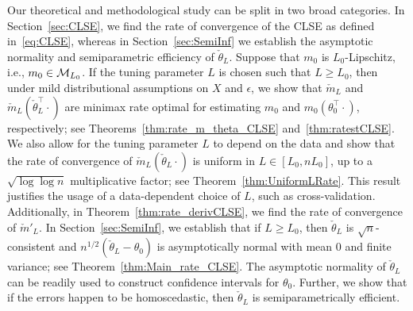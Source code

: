 
Our theoretical and methodological study can be split in two broad categories. In Section~\ref{sec:CLSE}, we find the rate of convergence of the CLSE as defined in~\eqref{eq:CLSE}, whereas in Section~\ref{sec:SemiInf} we establish the asymptotic normality and semiparametric efficiency of $\check{\theta}_{L}$. Suppose that $m_0$ is $L_0$-Lipschitz, i.e., $m_0 \in \mathcal{M}_{L_0}$. If the tuning parameter $L$ is chosen such that $L \ge L_0$, then under mild distributional assumptions on $X$ and $\epsilon$, we show that $\check{m}_{L}$ and $\check{m}_{L}(\check{\theta}_{L}^\top \cdot)$ are minimax rate optimal for estimating $m_0$  and $m_0(\theta_0^\top \cdot)$, respectively; see Theorems~\ref{thm:rate_m_theta_CLSE} and~\ref{thm:ratestCLSE}. We also allow for the tuning parameter $L$ to depend on the data and show that the rate of convergence of $\check{m}_{L}(\check{\theta}_{L} \cdot)$ is uniform in $ L\in [L_0, nL_0]$, up to a $\sqrt{\log\log n}$ multiplicative factor; see Theorem~\ref{thm:UniformLRate}. This result justifies the usage of a data-dependent choice of $L$, such as cross-validation. Additionally, in Theorem~\ref{thm:rate_derivCLSE}, we find the rate of convergence of $\check{m}'_{L}.$ In Section~\ref{sec:SemiInf}, we establish that if $L\ge L_0$, then  $\check{\theta}_{L}$  is $\sqrt{n}$-consistent and $n^{1/2}(\check{\theta}_L - \theta_0)$ is asymptotically normal with mean $0$ and finite variance; see Theorem~\ref{thm:Main_rate_CLSE}. The asymptotic normality of $\check{\theta}_{L}$ can be readily used to  construct confidence intervals for ${\theta}_0$. Further, we show that  if the errors happen to be homoscedastic, then $\check{\theta}_{L}$ is semiparametrically efficient. 

